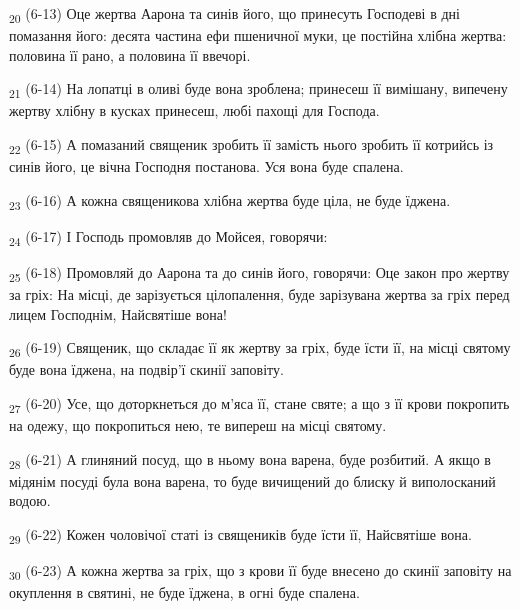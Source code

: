 \begin{tcolorbox}
\textsubscript{20} (6-13) Оце жертва Аарона та синів його, що принесуть Господеві в дні помазання його: десята частина ефи пшеничної муки, це постійна хлібна жертва: половина її рано, а половина її ввечорі.
\end{tcolorbox}
\begin{tcolorbox}
\textsubscript{21} (6-14) На лопатці в оливі буде вона зроблена; принесеш її вимішану, випечену жертву хлібну в кусках принесеш, любі пахощі для Господа.
\end{tcolorbox}
\begin{tcolorbox}
\textsubscript{22} (6-15) А помазаний священик зробить її замість нього зробить її котрийсь із синів його, це вічна Господня постанова. Уся вона буде спалена.
\end{tcolorbox}
\begin{tcolorbox}
\textsubscript{23} (6-16) А кожна священикова хлібна жертва буде ціла, не буде їджена.
\end{tcolorbox}
\begin{tcolorbox}
\textsubscript{24} (6-17) І Господь промовляв до Мойсея, говорячи:
\end{tcolorbox}
\begin{tcolorbox}
\textsubscript{25} (6-18) Промовляй до Аарона та до синів його, говорячи: Оце закон про жертву за гріх: На місці, де зарізується цілопалення, буде зарізувана жертва за гріх перед лицем Господнім, Найсвятіше вона!
\end{tcolorbox}
\begin{tcolorbox}
\textsubscript{26} (6-19) Священик, що складає її як жертву за гріх, буде їсти її, на місці святому буде вона їджена, на подвір'ї скинії заповіту.
\end{tcolorbox}
\begin{tcolorbox}
\textsubscript{27} (6-20) Усе, що доторкнеться до м'яса її, стане святе; а що з її крови покропить на одежу, що покропиться нею, те випереш на місці святому.
\end{tcolorbox}
\begin{tcolorbox}
\textsubscript{28} (6-21) А глиняний посуд, що в ньому вона варена, буде розбитий. А якщо в мідянім посуді була вона варена, то буде вичищений до блиску й виполосканий водою.
\end{tcolorbox}
\begin{tcolorbox}
\textsubscript{29} (6-22) Кожен чоловічої статі із священиків буде їсти її, Найсвятіше вона.
\end{tcolorbox}
\begin{tcolorbox}
\textsubscript{30} (6-23) А кожна жертва за гріх, що з крови її буде внесено до скинії заповіту на окуплення в святині, не буде їджена, в огні буде спалена.
\end{tcolorbox}
